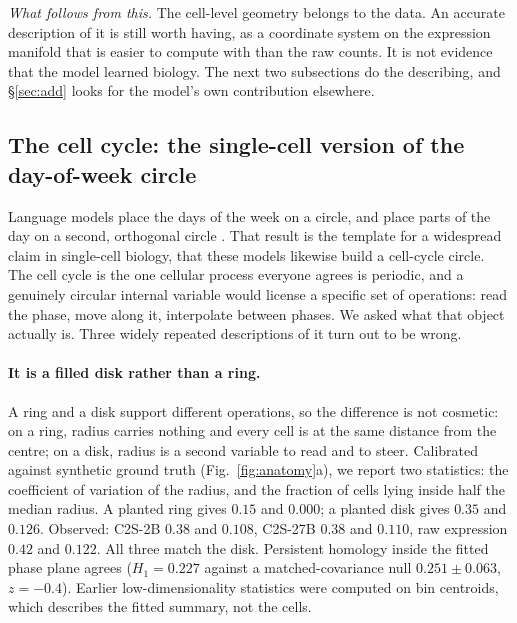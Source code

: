 \documentclass[11pt]{article}
\begin{document}
\emph{What follows from this.} The cell-level geometry belongs to the data. An accurate description of
it is still worth having, as a coordinate system on the expression manifold that is easier to compute
with than the raw counts. It is not evidence that the model learned biology. The next two subsections
do the describing, and \S\ref{sec:add} looks for the model's own contribution elsewhere.

\subsection{The cell cycle: the single-cell version of the day-of-week circle}
Language models place the days of the week on a circle, and place parts of the day on a second,
orthogonal circle \citep{engels2025circular}. That result is the template for a widespread claim in
single-cell biology, that these models likewise build a cell-cycle circle. The cell cycle is the one
cellular process everyone agrees is periodic, and a genuinely circular internal variable would license
a specific set of operations: read the phase, move along it, interpolate between phases. We asked what
that object actually is. Three widely repeated descriptions of it turn out to be wrong.

\paragraph{It is a filled disk rather than a ring.} A ring and a disk support different operations, so
the difference is not cosmetic: on a ring, radius carries nothing and every cell is at the same
distance from the centre; on a disk, radius is a second variable to read and to steer. Calibrated
against synthetic ground truth (Fig.~\ref{fig:anatomy}a), we report two statistics: the coefficient of
variation of the radius, and the fraction of cells lying inside half the median radius. A planted ring
gives $0.15$ and $0.000$; a planted disk gives $0.35$ and $0.126$. Observed: C2S-2B $0.38$ and $0.108$,
C2S-27B $0.38$ and $0.110$, raw expression $0.42$ and $0.122$. All three match the disk. Persistent
homology inside the fitted phase plane agrees ($H_1=0.227$ against a matched-covariance null
$0.251\pm0.063$, $z=-0.4$). Earlier low-dimensionality statistics were computed on bin centroids, which
describes the fitted summary, not the cells.
\end{document}
